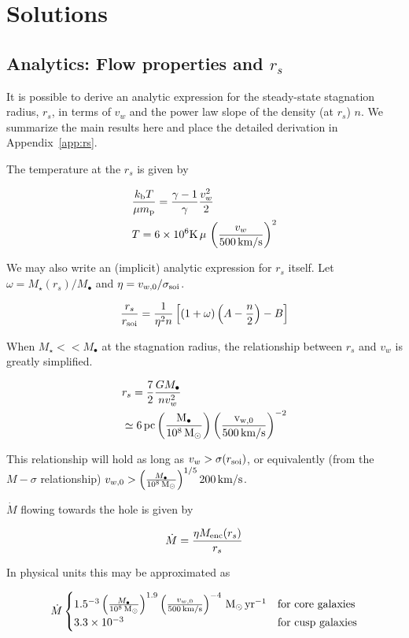 \documentclass[usenatbib,fleqn]{mn2e}
\newcommand{\Mdot}{\dot{M}}
\newcommand{\rs}{r_s}
\newcommand{\vw}{v_w}
\newcommand{\kew}{\frac{v_w^2}{2}}
\newcommand{\gammafi}{\frac{\gamma-1}{\gamma}}
\newcommand{\kb}{k_{\rm b}}
\renewcommand{\mp}{m_{\rm p}}
\newcommand{\pc}{\rm pc}
\newcommand{\Menc}{M_{\rm enc}}
\newcommand{\Mstar}{M_{\star}}
\newcommand{\Mbh}[1][]{M_{\bullet#1}}
\newcommand{\MbhNorm}{\frac{\Mbh}{10^8 \Msun}}
\newcommand{\soi}{\rm soi}
\newcommand{\rsoi}{r_{\soi}}
\newcommand{\vwO}{v_{w,0}}
\newcommand{\x}{\frac{r_s}{\rsoi}}
\newcommand{\vwNormB}{\frac{\vwO}{500 \, {\rm km/s}}}
\newcommand{\pyear}{{\rm yr}^{-1}}
\begin{document}
\section{Solutions}
\subsection{Analytics: Flow properties and $\rs$}
It is possible to derive an analytic expression for the steady-state stagnation radius, $\rs$, in terms of $v_w$ and the power law slope of the density (at $\rs$) $n$.   We summarize the main results here and place the detailed derivation in Appendix~\ref{app:rs}.

The temperature at the $\rs$ is given by

\begin{align}
 &\frac{\kb T}{\mu \mp}=\gammafi \kew \label{eq:tstag}\\
 &T=6 \times 10^6 {\rm K} \, \mu \, \left({\frac{\vw}{500 \,{\rm km/s}}}\right)^2 
\end{align}

We may also write an (implicit) analytic expression for $\rs$ itself. Let $\omega=\Mstar(\rs)/\Mbh$ and  $\eta=v_{w,0}/\sigma_{\rm soi}$. 

\begin{align}
\x=\frac{1}{\eta^2 n}\left[ (1+\omega)\left(A-\frac{n}{2}\right)-B\right]
\label{eq:stag_analytic}
\end{align}

When $\Mstar << \Mbh$ at the stagnation radius, the relationship between $\rs$ and $\vw$ is greatly simplified. 

\begin{align}
&\rs=\frac{7}{2}\frac{G \Mbh}{n \vw^2}\\
&\simeq 6 \, \pc \left(\MbhNorm\right) \left(\vwNormB\right)^{-2}
\label{eq:stag_simple}
\end{align}

This relationship will hold as long as $\vw > \sigma(\rsoi)$, or equivalently (from the $M-\sigma$ relationship) $\vwO > \left(\frac{\Mbh}{10^8 \Msun}\right)^{1/5} 200 {\rm \,  km/s}$.

$\Mdot$ flowing towards the hole is given by

\begin{align}
\dot{M}=\frac{\eta \Menc(\rs)}{\rs}
\end{align}

In physical units this may be approximated as 

\[
\dot{M}
\begin{cases}
   1.5 \time 10^{-3}  \left(\MbhNorm\right)^{1.9} \left(\vwNormB\right)^{-4} \Msun \, \pyear& \text{for core galaxies} \\
   3.3 \times 10^{-3}   & \text{for cusp galaxies}     
\end{cases}
\label{eq:cooling}
\]
\end{document}
